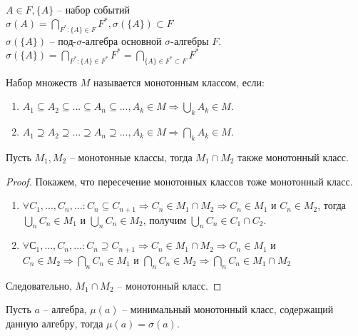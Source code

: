 \begin{corollary}
  $A \in F, \{A\}$ -- набор событий\\
  $\sigma(A) = \bigcap\limits_{F^*:\{A\}\in F}F^*, \sigma(\{A\})\subset F$\\
  $\sigma(\{A\})$ -- под-$\sigma$-алгебра основной $\sigma$-алгебры $F$.\\
  $\sigma(\{A\}) = \bigcap\limits_{F^*:\{A\}\in F^*} F^* = \bigcap\limits_{\{A\}\in F^*\subset F} F^*$
\end{corollary}

\begin{definition}
  Набор множеств $M$ называется монотонным классом, если:
  \begin{enumerate}
    \item $A_1\subseteq A_2\subseteq ... \subseteq A_n \subseteq ..., A_k \in M \Rightarrow \bigcup\limits_k A_k \in M$.
    \item $A_1 \supseteq A_2\supseteq ... \supseteq A_n \supseteq ..., A_k \in M \Rightarrow \bigcap\limits_k A_k \in M$.
  \end{enumerate}
\end{definition}

\begin{proposition}
  Пусть $M_1,M_2$ -- монотонные классы, тогда $M_1 \cap M_2$ также монотонный класс.
\end{proposition}

\begin{proof} Покажем, что пересечение монотонных классов тоже монотонный класс.
  \begin{enumerate}
    \item $\forall C_1,...,C_n,...: C_n \subseteq C_{n+1} \Rightarrow C_n \in M_1\cap M_2 \Rightarrow C_n \in M_1$ и $C_n \in M_2$, тогда $\bigcup\limits_n C_n \in M_1$ и $\bigcup\limits_n C_n \in M_2$, получим $\bigcup\limits_n C_n \in C_1\cap C_2$.
    \item $\forall С_1,...,C_n,...: C_n \supseteq C_{n+1} \Rightarrow C_n \in M_1\cap M_2 \Rightarrow C_n \in M_1$ и $C_n \in M_2 \Rightarrow \bigcap\limits_n C_n \in M_1$ и $\bigcap\limits_n C_n \in M_2 \Rightarrow \bigcap\limits_n C_n \in M_1\cap M_2$
  \end{enumerate}
  Следовательно, $M_1\cap M_2$ -- монотонный класс.
\end{proof}

\begin{example}
  Пусть $a$ -- алгебра, $\mu (a)$ -- минимальный монотонный класс, содержащий данную алгебру, тогда $\mu (a) = \sigma (a)$.
\end{example}

